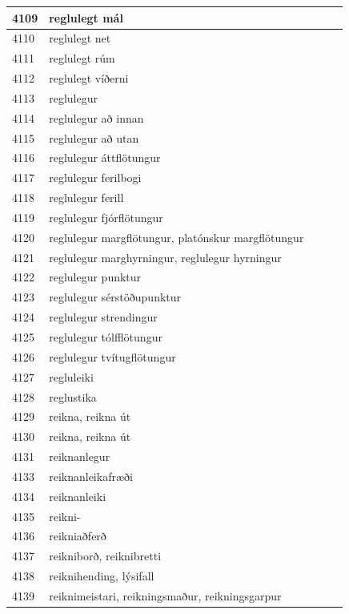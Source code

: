 \begin{longtable}{p{}|p{}|p{}|p{}|p{}}
\hline
4109 & reglulegt mál &  &  &  \\
\hline
4110 & reglulegt net &  &  &  \\
\hline
4111 & reglulegt rúm &  &  &  \\
\hline
4112 & reglulegt víðerni &  &  &  \\
\hline
4113 & reglulegur &  &  &  \\
\hline
4114 & reglulegur að innan &  &  &  \\
\hline
4115 & reglulegur að utan &  &  &  \\
\hline
4116 & reglulegur áttflötungur &  &  &  \\
\hline
4117 & reglulegur ferilbogi &  &  &  \\
\hline
4118 & reglulegur ferill &  &  &  \\
\hline
4119 & reglulegur fjórflötungur &  &  &  \\
\hline
4120 & reglulegur margflötungur, platónskur margflötungur &  &  &  \\
\hline
4121 & reglulegur marghyrningur, reglulegur hyrningur &  &  &  \\
\hline
4122 & reglulegur punktur &  &  &  \\
\hline
4123 & reglulegur sérstöðupunktur &  &  &  \\
\hline
4124 & reglulegur strendingur &  &  &  \\
\hline
4125 & reglulegur tólfflötungur &  &  &  \\
\hline
4126 & reglulegur tvítugflötungur &  &  &  \\
\hline
4127 & regluleiki &  &  &  \\
\hline
4128 & reglustika &  &  &  \\
\hline
4129 & reikna, reikna út &  &  &  \\
\hline
4130 & reikna, reikna út &  &  &  \\
\hline
4131 & reiknanlegur &  &  &  \\
\hline
4133 & reiknanleikafræði &  &  &  \\
\hline
4134 & reiknanleiki &  &  &  \\
\hline
4135 & reikni- &  &  &  \\
\hline
4136 & reikniaðferð &  &  &  \\
\hline
4137 & reikniborð, reiknibretti &  &  &  \\
\hline
4138 & reiknihending, lýsifall &  &  &  \\
\hline
4139 & reiknimeistari, reikningsmaður, reikningsgarpur &  &  &  \\

\end{longtable}
